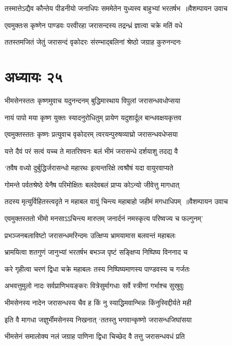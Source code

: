 \threelineshloka
{तस्मात्तेऽद्यैव कौन्तेय पीडनीयो जनाधिपः}
{सममेतेन युध्यस्व बाहुभ्यां भरतर्षभ ॥वैशम्पायन उवाच}
{}


\twolineshloka
{एवमुक्तःस कृष्णेन पाण्डवः परवीरहा}
{जरासन्दस्य तद्रन्ध्रं ज्ञात्वा चक्रे मतिं वधे}


\twolineshloka
{ततस्तमजितं जेतुं जरासन्दं वृकोदरः}
{संरम्भाद्बलिनां श्रेष्ठो जग्राह कुरुनन्दनः}


\chapter{अध्यायः २५}
\twolineshloka
{भीमसेनस्ततः कृष्णमुवाच यदुनन्दनम्}
{बुद्धिमास्थाय विपुलां जरासन्धवधोप्सया}


\twolineshloka
{नायं पापो मया कृष्ण युक्तः स्यादनुरोधितुम्}
{प्रायेण यदुशार्दूल बान्धवक्षयकृत्तव}


\twolineshloka
{एवमुक्तस्ततः कृष्णः प्रत्युवाच वृकोदरम्}
{त्वरयन्पुरुषव्याघ्रो जरासन्धवधेप्सया}


\twolineshloka
{यत्ते दैवं परं सत्वं यच्च ते मातरिश्वनः}
{बलं भीमं जरासन्धे दर्शयाशु तदद्य वै}


\twolineshloka
{`तवैष वध्यो दुर्बुद्धिर्जरासन्धो महारथः}
{इत्यन्तरिक्षे त्वश्रौषं यदा वायुरवाप्यते}


\twolineshloka
{गोमन्ते पर्वतश्रेष्ठे येनैष परिमोक्षितः}
{बलदेवबलं प्राप्य कोऽन्यो जीवेत्तु मागधात्}


\threelineshloka
{तदस्य मृत्युर्विहितस्त्वदृते न महाबल}
{वायुं चिन्त्य महाबाहो जहीमं मगधाधिपम् ॥वैशम्पायन उवाच}
{}


\twolineshloka
{एवमुक्तस्ततो भीमो मनसाऽऽचिन्त्य मारुतम्}
{जनार्दनं नमस्कृत्य परिष्वज्य च फल्गुनम्'}


\twolineshloka
{प्रभञ्जनबलाविष्टो जरासन्धमरिन्दमः}
{उत्क्षिप्य भ्रामयामास बलवन्तं महाबलः}


\twolineshloka
{भ्रामयित्वा शतगुणं जानुभ्यां भरतर्षभ}
{बभञ्ज पृष्टं सङ्क्षिप्य निष्पिष्य विननाद च}


\twolineshloka
{करे गृहीत्वा चरणं द्विधा चक्रे महाबलः}
{तस्य निष्पिष्यमाणस्य पाण्डवस्य च गर्जतः}


\twolineshloka
{अभवत्तुमुलो नादः सर्वप्राणिभयङ्करः}
{वित्रेसुर्मागधाः सर्वे स्त्रीणां गर्भाश्च सुस्रुवुः}


\twolineshloka
{भीमसेनस्य नादेन जरासन्धस्य चैव ह}
{किं नु स्याद्धिमवान्भिन्नः किंनुस्विद्दीर्यते मही}


\twolineshloka
{इति वै मागधा जज्ञुर्भीमसेनस्य निखनात्}
{`ततस्तु भगवान्कृष्णो जरासन्धजिघांसया}


\twolineshloka
{भीमसेनं समालोक्य नलं जग्राह पाणिना}
{द्विधा चिच्छेद वै तत्तु जरासन्धवधं प्रति}


